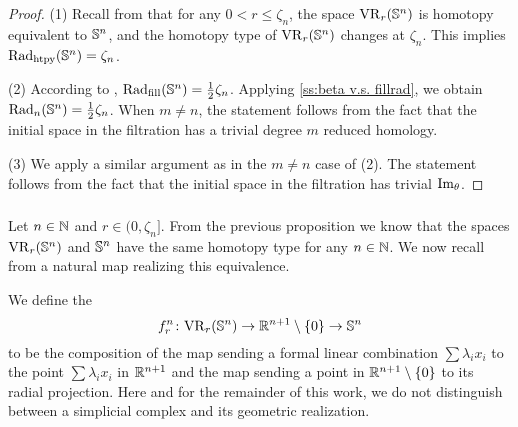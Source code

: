 \begin{proof}
	(1) Recall from \cite[Thm.~7.1]{lim2024vietoris} that for any $0 < r \leq \zeta_n$, the space $\mathrm{VR}_r(\mathbb{S}^n)$ is homotopy equivalent to $\mathbb{S}^n$, and the homotopy type of $\mathrm{VR}_r(\mathbb{S}^n)$ changes at $\zeta_n$.
	This implies $\mathrm{Rad}_{\mathrm{htpy}}(\mathbb{S}^n)=\zeta_n$.

	(2) According to \cite{katz1983filling}, \(\mathrm{Rad}_{\mathrm{fill}}(\mathbb{S}^n) = \frac{1}{2}\zeta_n\).
	Applying \cref{ss:beta v.s. fillrad}, we obtain \(\mathrm{Rad}_{n}(\mathbb{S}^n) = \frac{1}{2}\zeta_n\).
    When $m\neq n$, the statement follows from the fact that the initial space in the filtration has a trivial degree $m$ reduced homology.

	(3) We apply a similar argument as in the $m\neq n$ case of (2). The statement follows from the fact that the initial space in the filtration has trivial $\operatorname{Im}_\theta$.
\end{proof}

\subsubsection{}\label{ss:VRSn projection}

Let \(n \in \mathbb{N}\) and \(r \in (0, \zeta_n]\).
From the previous proposition we know that the spaces \(\mathrm{VR}_r(\mathbb{S}^n)\) and \(\mathbb{S}^n\) have the same homotopy type for any \(n \in \mathbb{N}\).
We now recall from \cite{adamaszek2020homotopy} a natural map realizing this equivalence.

We define the 
\[
f_r^n \colon \mathrm{VR}_r(\mathbb{S}^n) \to \mathbb{R}^{n+1} \setminus \{0\} \to \mathbb{S}^n
\]
to be the composition of the map sending a formal linear combination $\sum\lambda_i x_i$ to the point \(\sum\lambda_i x_i\) in \(\mathbb{R}^{n+1}\) and the map sending a point in \(\mathbb{R}^{n+1} \setminus \{0\}\) to its radial projection.
Here and for the remainder of this work, we do not distinguish between a simplicial complex and its geometric realization.

